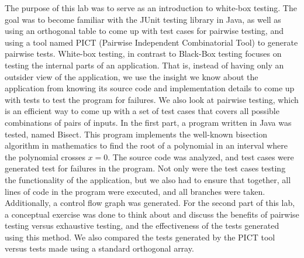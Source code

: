 The purpose of this lab was to serve as an introduction to white-box testing.
The goal was to become familiar with the JUnit testing library in Java, as well
as using an orthogonal table to come up with test cases for pairwise testing,
and using a tool named PICT (Pairwise Independent Combinatorial Tool) to
generate pairwise tests. White-box testing, in contrast to Black-Box testing
focuses on testing the internal parts of an application. That is, instead of
having only an outsider view of the application, we use the insight we know
about the application from knowing its source code and implementation details
to come up with tests to test the program for failures. We also look at
pairwise testing, which is an efficient way to come up with a set of test cases
that covers all possible combinations of pairs of inputs.  In the first part, a
program written in Java was tested, named Bisect.  This program implements the
well-known bisection algorithm in mathematics to find the root of a polynomial
in an interval where the polynomial crosses $x=0$. The source code was
analyzed, and test cases were generated test for failures in the program. Not
only were the test cases testing the functionality of the application, but we
also had to ensure that together, all lines of code in the program were
executed, and all branches were taken. Additionally, a control flow graph was
generated. For the second part of this lab, a conceptual exercise was done to
think about and discuss the benefits of pairwise testing versus exhaustive
testing, and the effectiveness of the tests generated using this method. We
also compared the tests generated by the PICT tool versus tests made using a
standard orthogonal array.

